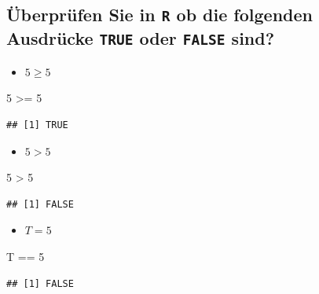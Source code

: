 \documentclass[12pt,a4paper]{article}
\newenvironment{Shaded}{\begin{snugshade}}{\end{snugshade}}
\newcommand{\DecValTok}[1]{\textcolor[rgb]{0.00,0.00,0.81}{#1}}
\newcommand{\NormalTok}[1]{#1}
\newcommand{\SpecialCharTok}[1]{\textcolor[rgb]{0.00,0.00,0.00}{#1}}
\begin{document}
\hypertarget{uxfcberpruxfcfen-sie-in-r-ob-die-folgenden-ausdruxfccke-true-oder-false-sind}{%
\subsection{\texorpdfstring{Überprüfen Sie in \texttt{R} ob die
folgenden Ausdrücke \texttt{TRUE} oder \texttt{FALSE}
sind?}{Überprüfen Sie in R ob die folgenden Ausdrücke TRUE oder FALSE sind?}}\label{uxfcberpruxfcfen-sie-in-r-ob-die-folgenden-ausdruxfccke-true-oder-false-sind}}

\begin{itemize}
  \item $5 \geq 5$
\end{itemize}

\begin{Shaded}
\begin{Highlighting}[]
    \DecValTok{5} \SpecialCharTok{\textgreater{}=} \DecValTok{5}
\end{Highlighting}
\end{Shaded}

\begin{verbatim}
## [1] TRUE
\end{verbatim}

\begin{itemize}
  \item $5 > 5$
\end{itemize}

\begin{Shaded}
\begin{Highlighting}[]
    \DecValTok{5} \SpecialCharTok{\textgreater{}} \DecValTok{5}
\end{Highlighting}
\end{Shaded}

\begin{verbatim}
## [1] FALSE
\end{verbatim}

\begin{itemize}
  \item $T = 5$
\end{itemize}

\begin{Shaded}
\begin{Highlighting}[]
\NormalTok{    T }\SpecialCharTok{==} \DecValTok{5}
\end{Highlighting}
\end{Shaded}

\begin{verbatim}
## [1] FALSE
\end{verbatim}
\end{document}
